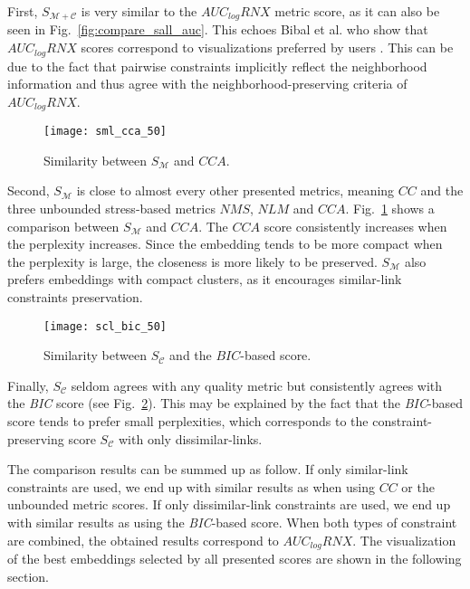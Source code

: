 First, $S_{\mathcal{M}+\mathcal{C}}$ is very similar to the $AUC_{log}RNX$ metric score, as it can also be seen in Fig.~\ref{fig:compare_sall_auc}. This echoes Bibal et al. who show that $AUC_{log}RNX$ scores correspond to visualizations preferred by users \cite{bibal2016}. This can be due to the fact that pairwise constraints implicitly reflect the neighborhood information and thus agree with the neighborhood-preserving criteria of $AUC_{log}RNX$.

\begin{figure}
  \centering
  \texttt{[image: sml\_cca\_50]}
  \caption{Similarity between $S_{\mathcal{M}}$ and $CCA$.}
  \label{fig:compare_sml_cca}
\end{figure}

Second, $S_\mathcal{M}$ is close to almost every other presented metrics, meaning $CC$ and the three unbounded stress-based metrics $NMS$, $NLM$ and $CCA$.%
Fig.~\ref{fig:compare_sml_cca} shows a comparison between $S_\mathcal{M}$ and $CCA$. The $CCA$ score consistently increases when the perplexity increases. Since the embedding tends to be more compact when the perplexity is large, the closeness is more likely to be preserved. $S_{\mathcal{M}}$ also prefers embeddings with compact clusters, as it encourages similar-link constraints preservation.

\begin{figure}
  \centering
  \texttt{[image: scl\_bic\_50]}
  \caption{Similarity between $S_{\mathcal{C}}$ and the $BIC$-based score.}
  \label{fig:compare_scl_bic}
\end{figure}

Finally, $S_\mathcal{C}$ seldom agrees with any quality metric but consistently agrees with the \emph{BIC} score (see Fig.~\ref{fig:compare_scl_bic}). This may be explained by the fact that the \emph{BIC}-based score tends to prefer small perplexities, which corresponds to the constraint-preserving score $S_\mathcal{C}$ with only dissimilar-links.

The comparison results can be summed up as follow. 
If only similar-link constraints are used, we end up with similar results as when using $CC$ or the unbounded metric scores.
If only dissimilar-link constraints are used, we end up with similar results as using the \emph{BIC}-based score.
When both types of constraint are combined, the obtained results correspond to $AUC_{log}RNX$.
The visualization of the best embeddings selected by all presented scores are shown in the following section.

